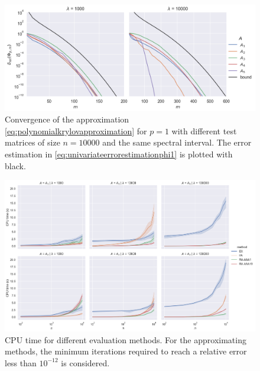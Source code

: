 
\begin{figure}[h]
    \centering
    \includegraphics[width=\textwidth]{img/krylovapproximation/cnvg_matrices_PA_n10000.png}
    \caption{Convergence of the approximation \eqref{eq:polynomialkrylovapproximation}
    for $p=1$ with different test matrices of size $n=10000$ and the same spectral interval.
    The error estimation in \eqref{eq:univariateerrorestimationphi1} is plotted with black.}
    \label{fig:krylovapproximationmatrices}
\end{figure}

\begin{figure}[h]
    \centering
    \includegraphics[width=.9\textwidth]{img/krylovapproximation/cputime_methods.png}
    \caption{
        CPU time for different evaluation methods. For the approximating methods,
        the minimum iterations required to reach a relative error less than $10^{-12}$
        is considered.
    }
    \label{fig:krylovapproximationcputime}
\end{figure}

